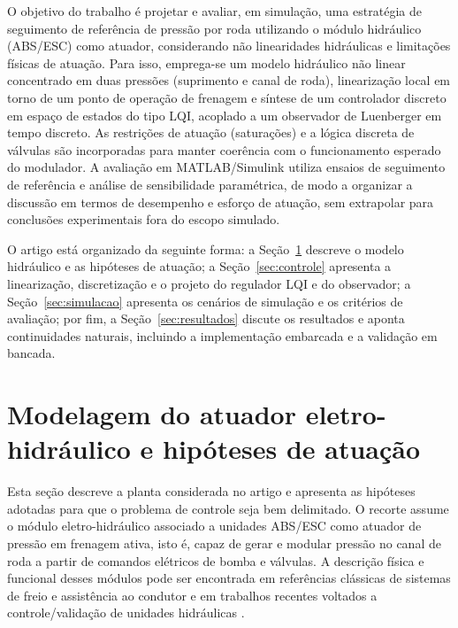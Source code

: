 \documentclass[a4paper]{ifacconf}
\begin{document}
O objetivo do trabalho é projetar e avaliar, em simulação, uma estratégia de seguimento de referência de pressão por roda utilizando o módulo hidráulico (ABS/ESC) como atuador, considerando não linearidades hidráulicas e limitações físicas de atuação. Para isso, emprega-se um modelo hidráulico não linear concentrado em duas pressões (suprimento e canal de roda), linearização local em torno de um ponto de operação de frenagem e síntese de um controlador discreto em espaço de estados do tipo LQI, acoplado a um observador de Luenberger em tempo discreto. As restrições de atuação (saturações) e a lógica discreta de válvulas são incorporadas para manter coerência com o funcionamento esperado do modulador. A avaliação em MATLAB/Simulink utiliza ensaios de seguimento de referência e análise de sensibilidade paramétrica, de modo a organizar a discussão em termos de desempenho e esforço de atuação, sem extrapolar para conclusões experimentais fora do escopo simulado.

O artigo está organizado da seguinte forma: a Seção~\ref{sec:modelagem} descreve o modelo hidráulico e as hipóteses de atuação; a Seção~\ref{sec:controle} apresenta a linearização, discretização e o projeto do regulador LQI e do observador; a Seção~\ref{sec:simulacao} apresenta os cenários de simulação e os critérios de avaliação; por fim, a Seção~\ref{sec:resultados} discute os resultados e aponta continuidades naturais, incluindo a implementação embarcada e a validação em bancada.

\section{Modelagem do atuador eletro-hidráulico e hipóteses de atuação}
\label{sec:modelagem}
Esta seção descreve a planta considerada no artigo e apresenta as hipóteses adotadas para que o problema de controle seja bem delimitado. O recorte assume o módulo eletro-hidráulico associado a unidades ABS/ESC como atuador de pressão em frenagem ativa, isto é, capaz de gerar e modular pressão no canal de roda a partir de comandos elétricos de bomba e válvulas. A descrição física e funcional desses módulos pode ser encontrada em referências clássicas de sistemas de freio e assistência ao condutor \cite{Konrad2014,Rudolf2011} e em trabalhos recentes voltados a controle/validação de unidades hidráulicas \cite{HouhuaJing2022,ZengYangHuang2023}.
\end{document}
